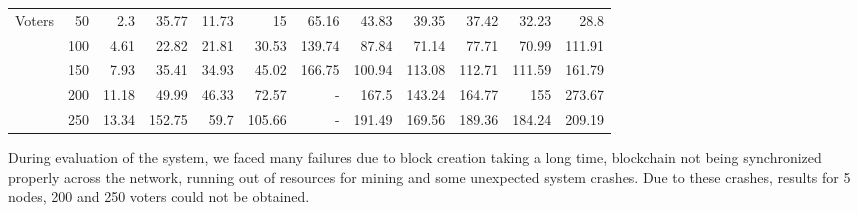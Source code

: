 \documentclass[10pt,final,journal,a4paper,oneside,twocolumn]{IEEEtran}
\begin{document}
\begin{table}
\begin{tabular}{|cr|rrrrrrrrrr|}
				\multicolumn{1}{|c|}{Voters}            & 50  & \multicolumn{1}{r|}{2.3}   & \multicolumn{1}{r|}{35.77}  & \multicolumn{1}{r|}{11.73} & \multicolumn{1}{r|}{15}     & \multicolumn{1}{r|}{65.16}  & \multicolumn{1}{r|}{43.83}  & \multicolumn{1}{r|}{39.35}  & \multicolumn{1}{r|}{37.42}  & \multicolumn{1}{r|}{32.23}  & 28.8   \\ \cline{2-12} 
				\multicolumn{1}{|c|}{\multirow{4}{*}{}} & 100 & \multicolumn{1}{r|}{4.61}  & \multicolumn{1}{r|}{22.82}  & \multicolumn{1}{r|}{21.81} & \multicolumn{1}{r|}{30.53}  & \multicolumn{1}{r|}{139.74} & \multicolumn{1}{r|}{87.84}  & \multicolumn{1}{r|}{71.14}  & \multicolumn{1}{r|}{77.71}  & \multicolumn{1}{r|}{70.99}  & 111.91 \\ \cline{2-12} 
				\multicolumn{1}{|c|}{}                  & 150 & \multicolumn{1}{r|}{7.93}  & \multicolumn{1}{r|}{35.41}  & \multicolumn{1}{r|}{34.93} & \multicolumn{1}{r|}{45.02}  & \multicolumn{1}{r|}{166.75} & \multicolumn{1}{r|}{100.94} & \multicolumn{1}{r|}{113.08} & \multicolumn{1}{r|}{112.71} & \multicolumn{1}{r|}{111.59} & 161.79 \\ \cline{2-12} 
				\multicolumn{1}{|c|}{}                  & 200 & \multicolumn{1}{r|}{11.18} & \multicolumn{1}{r|}{49.99}  & \multicolumn{1}{r|}{46.33} & \multicolumn{1}{r|}{72.57}  & \multicolumn{1}{r|}{-}      & \multicolumn{1}{r|}{167.5}  & \multicolumn{1}{r|}{143.24} & \multicolumn{1}{r|}{164.77} & \multicolumn{1}{r|}{155}    & 273.67 \\ \cline{2-12} 
				\multicolumn{1}{|c|}{}                  & 250 & \multicolumn{1}{r|}{13.34} & \multicolumn{1}{r|}{152.75} & \multicolumn{1}{r|}{59.7}  & \multicolumn{1}{r|}{105.66} & \multicolumn{1}{r|}{-}      & \multicolumn{1}{r|}{191.49} & \multicolumn{1}{r|}{169.56} & \multicolumn{1}{r|}{189.36} & \multicolumn{1}{r|}{184.24} & 209.19 \\ \hline
			\end{tabular}
		\end{table}
		
		During evaluation of the system, we faced many failures due to block creation taking a long time, blockchain not being synchronized properly across the network, running out of resources for mining and some unexpected system crashes. Due to these crashes, results for 5 nodes, 200 and 250 voters could not be obtained.
\end{document}
